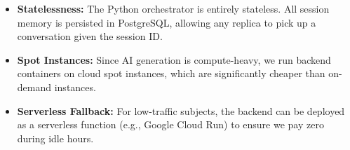 \begin{itemize}
    \item \textbf{Statelessness:} The Python orchestrator is entirely stateless. All session memory is persisted in PostgreSQL, allowing any replica to pick up a conversation given the session ID.
    \item \textbf{Spot Instances:} Since AI generation is compute-heavy, we run backend containers on cloud spot instances, which are significantly cheaper than on-demand instances.
    \item \textbf{Serverless Fallback:} For low-traffic subjects, the backend can be deployed as a serverless function (e.g., Google Cloud Run) to ensure we pay zero during idle hours.
\end{itemize}
